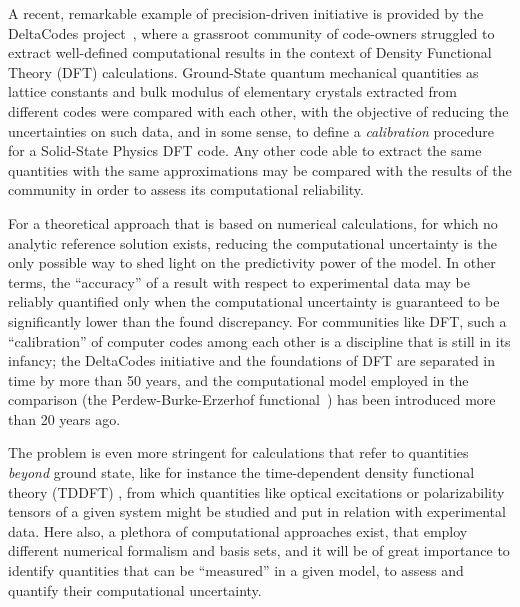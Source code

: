 \documentclass[reprint,aps,prb]{revtex4-1}
\begin{document}
A recent, remarkable example of precision-driven initiative is provided by the DeltaCodes project~\cite{deltaTest2016},
where a grassroot community of code-owners struggled to extract well-defined computational results in the context of 
Density Functional Theory (DFT) calculations. Ground-State quantum mechanical quantities as lattice constants and bulk modulus of 
elementary crystals extracted from different codes were compared with each other, with the objective of reducing the uncertainties 
on such data, and in some sense, to define a \emph{calibration} procedure for a Solid-State Physics DFT code. 
Any other code able to extract the same quantities with the same approximations may be compared with the 
results of the community in order to assess its computational reliability.

For a theoretical approach that is based on numerical calculations, for which no analytic reference solution exists, 
reducing the computational uncertainty is the only possible way to shed light on the predictivity power of the
model. In other terms, the ``accuracy'' of a result with respect to experimental data may be reliably quantified
only when the computational uncertainty is guaranteed to be significantly lower than the found discrepancy.
For communities like DFT, such a ``calibration'' of computer codes among each other is a discipline that is still in its infancy;
the DeltaCodes initiative and the foundations of DFT are separated in time by more than 50 years, and the computational
model employed in the comparison (the Perdew-Burke-Erzerhof functional~\cite{PBE}) has been introduced more than 20 years ago.

The problem is even more stringent for calculations that refer to quantities \emph{beyond} ground state, like
for instance the time-dependent density functional theory (TDDFT) \cite{casida1995,runge1984,onida2002},
from which quantities like optical excitations or polarizability tensors
of a given system might be studied and put in relation with experimental data.
Here also, a plethora of computational approaches exist, that employ different numerical formalism and
basis sets, and it will be of great importance to identify quantities that can be ``measured'' in a given model, to assess
and quantify their computational uncertainty.
\end{document}
